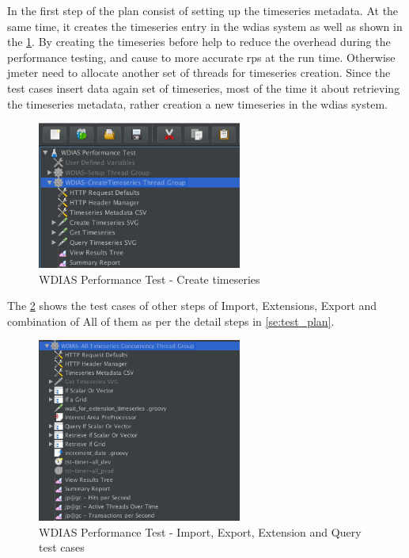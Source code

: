In the first step of the plan consist of setting up the timeseries metadata. At the same time, it creates the timeseries entry in the \acrshort{wdias} system as well as shown in the \ref{fi:test_create_timeseries}.
By creating the timeseries before help to reduce the overhead during the performance testing, and cause to more accurate \acrshort{rps} at the run time.
Otherwise \acrshort{jmeter} need to allocate another set of threads for timeseries creation. Since the test cases insert data again set of timeseries, most of the time it about retrieving the timeseries metadata, rather creation a new timeseries in the \acrshort{wdias} system.

\begin{figure}[htp]
    \centering
    \includegraphics[width=0.6\textwidth]{results/work_load/test_create_timeseries.png}
    \caption{WDIAS Performance Test - Create timeseries}
    \label{fi:test_create_timeseries}
\end{figure}

The \ref{fi:test_all_cases} shows the test cases of other steps of Import, Extensions, Export and combination of All of them as per the detail steps in \ref{se:test_plan}.

\begin{figure}[htp]
    \centering
    \includegraphics[width=0.6\textwidth]{results/work_load/test_all_cases.png}
    \caption{WDIAS Performance Test - Import, Export, Extension and Query test cases}
    \label{fi:test_all_cases}
\end{figure}

